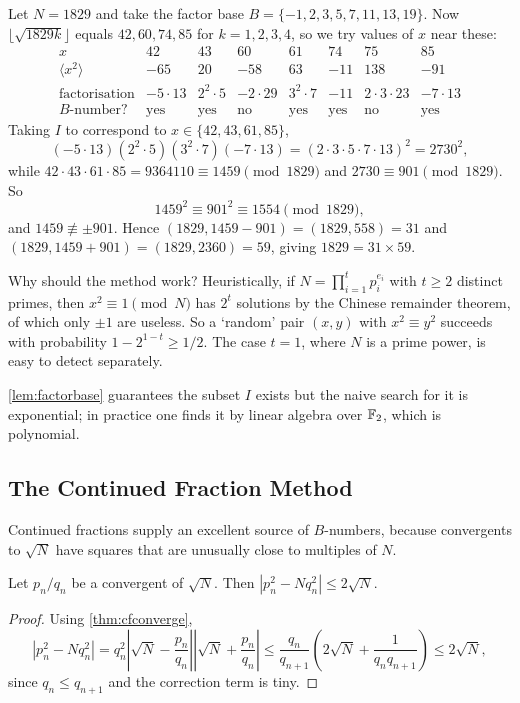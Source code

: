 \documentclass[a4paper]{scrartcl}
\begin{document}
\begin{example}
	Let $N = 1829$ and take the factor base $B = \{-1, 2, 3, 5, 7, 11, 13, 19\}$. Now $\lfloor\sqrt{1829k}\rfloor$ equals $42, 60, 74, 85$ for $k = 1,2,3,4$, so we try values of $x$ near these:
	$$
	\begin{array}{c|ccccccc}
		x & 42 & 43 & 60 & 61 & 74 & 75 & 85 \\ \hline
		\langle x^2\rangle & -65 & 20 & -58 & 63 & -11 & 138 & -91 \\
		\text{factorisation} & -5\cdot13 & 2^2\cdot 5 & -2\cdot29 & 3^2\cdot7 & -11 & 2\cdot3\cdot23 & -7\cdot13 \\
		B\text{-number?} & \text{yes} & \text{yes} & \text{no} & \text{yes} & \text{yes} & \text{no} & \text{yes}
	\end{array}
	$$
	Taking $I$ to correspond to $x \in \{42, 43, 61, 85\}$,
	$$
	(-5\cdot13)(2^2\cdot5)(3^2\cdot7)(-7\cdot13) = (2\cdot3\cdot5\cdot7\cdot13)^2 = 2730^2,
	$$
	while $42\cdot43\cdot61\cdot85 = 9364110 \equiv 1459 \pmod{1829}$ and $2730 \equiv 901\pmod{1829}$. So
	$$
	1459^2 \equiv 901^2 \equiv 1554 \pmod{1829},
	$$
	and $1459 \not\equiv\pm901$. Hence $(1829, 1459 - 901) = (1829, 558) = 31$ and $(1829, 1459+901) = (1829, 2360) = 59$, giving $1829 = 31\times59$.
\end{example}

\begin{remark}
	Why should the method work? Heuristically, if $N = \prod_{i=1}^tp_i^{e_i}$ with $t \geq 2$ distinct primes, then $x^2 \equiv 1\pmod N$ has $2^t$ solutions by the Chinese remainder theorem, of which only $\pm1$ are useless. So a `random' pair $(x,y)$ with $x^2\equiv y^2$ succeeds with probability $1 - 2^{1-t} \geq 1/2$. The case $t = 1$, where $N$ is a prime power, is easy to detect separately.

	\autoref{lem:factorbase} guarantees the subset $I$ exists but the naive search for it is exponential; in practice one finds it by linear algebra over $\mathbb{F}_2$, which is polynomial.
\end{remark}

\subsection{The Continued Fraction Method}

Continued fractions supply an excellent source of $B$-numbers, because convergents to $\sqrt N$ have squares that are unusually close to multiples of $N$.

\begin{lemma}
	Let $p_n/q_n$ be a convergent of $\sqrt N$. Then $|p_n^2 - Nq_n^2| \leq 2\sqrt N$.
\end{lemma}
\begin{proof}
	Using \autoref{thm:cfconverge},
	$$
	|p_n^2 - Nq_n^2| = q_n^2\left|\sqrt N - \frac{p_n}{q_n}\right|\left|\sqrt N + \frac{p_n}{q_n}\right| \leq \frac{q_n}{q_{n+1}}\left(2\sqrt N + \frac1{q_nq_{n+1}}\right) \leq 2\sqrt N,
	$$
	since $q_n \leq q_{n+1}$ and the correction term is tiny.
\end{proof}
\end{document}
